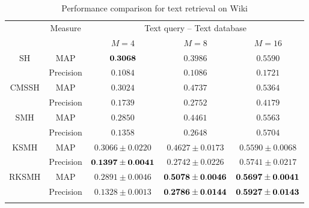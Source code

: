 \begin{table}[htb]\small
\caption{Performance comparison for text retrieval on \mbox{Wiki}}\label{table:comp-wiki-uni-tt}\vspace{-0.5cm}
\begin{center}
\begin{tabular}{|c|c|c|c|c|}
\toprule[1pt]\addlinespace[0pt]
    \multirow{2}{*}{Method}&  \multirow{2}{*}{Measure}  &  \multicolumn{3}{|c|}{Text query -- Text database}\\
\cline{3-5}%
&&$M=4$&$M=8$&$M=16$\\
\hline
\multirow{2}{*}{SH}&{MAP}  & ${\bf 0.3068}$ & $0.3986$&$ 0.5590 $\\
\cline{2-5}%
&{Precision}    &  $0.1084$           &$0.1086$&$ 0.1721 $\\
\hline %
\multirow{2}{*}{CMSSH}&{MAP}   &$0.3024   $&$    0.4737     $& $  0.5364 $\\
\cline{2-5}%
&{Precision}    & $0.1739   $&$   0.2752      $&$   0.4179  $\\
\hline%
\multirow{2}{*}{SMH}&MAP      &$0.2850      $&$ 0.4461   $&$ 0.5563  $\\
\cline{2-5}%
&{Precision}     &$0.1358      $&$ 0.2648   $&$ 0.5704 $\\
\hline%
\multirow{2}{*}{KSMH}&MAP        & $0.3066        \pm0.0220    $&$ 0.4627\pm  0.0173 $&$ 0.5590\pm    0.0068 $\\
\cline{2-5}%
&{Precision}   & $ {\bf 0.1397   \pm0.0041 } $&$  0.2742 \pm    0.0226    $&$    0.5741\pm 0.0217 $\\
\hline%
\multirow{2}{*}{RKSMH}&MAP       & $0.2891        \pm0.0046       $&$ {\bf 0.5078\pm  0.0046} $&$ {\bf 0.5697\pm0.0041 } $\\
\cline{2-5}%
&{Precision}    &$0.1328       \pm0.0013      $&$ {\bf 0.2786 \pm  0.0144 } $&$ {\bf 0.5927 \pm 0.0143} $\\
\addlinespace[0pt]\bottomrule[1pt]
\end{tabular}
\end{center}
\end{table}


